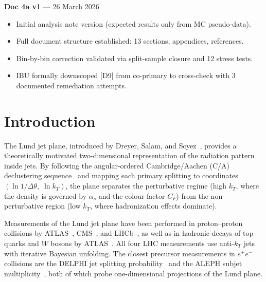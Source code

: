 \documentclass[11pt,a4paper]{article}
\begin{document}
\medskip

\textbf{Doc 4a v1} --- 26 March 2026
\begin{itemize}
\item Initial analysis note version (expected results only from MC pseudo-data).
\item Full document structure established: 13 sections, appendices, references.
\item Bin-by-bin correction validated via split-sample closure and 12 stress tests.
\item IBU formally downscoped [D9] from co-primary to cross-check with 3 documented remediation attempts.
\end{itemize}

\clearpage

\section{Introduction}
\label{sec:intro}

The Lund jet plane, introduced by Dreyer, Salam, and
Soyez~\cite{Dreyer:2018nbf}, provides a theoretically motivated
two-dimensional representation of the radiation pattern inside jets.
By following the angular-ordered Cambridge/Aachen (C/A)
declustering sequence~\cite{Dokshitzer:1997in} and mapping each
primary splitting to coordinates
$(\ln 1/\Delta\theta,\;\ln k_T)$, the plane separates the
perturbative regime (high $k_T$, where the density is governed by
$\alpha_s$ and the colour factor $C_F$) from the non-perturbative
region (low $k_T$, where hadronization effects dominate).

Measurements of the Lund jet plane have been performed in
proton--proton collisions by
ATLAS~\cite{ATLAS:2020bbn},
CMS~\cite{CMS:2024mlf},
and LHCb~\cite{LHCb:2025viq},
as well as in hadronic decays of top quarks and $W$ bosons by
ATLAS~\cite{ATLAS:2024wqo}.
All four LHC measurements use anti-$k_T$ jets with iterative
Bayesian unfolding.  The closest precursor measurements in
$e^+e^-$ collisions are the DELPHI jet splitting
probability~\cite{DELPHI:2003yqh} and the ALEPH subjet
multiplicity~\cite{ALEPH:1998hhp}, both of which probe
one-dimensional projections of the Lund plane.
\end{document}
